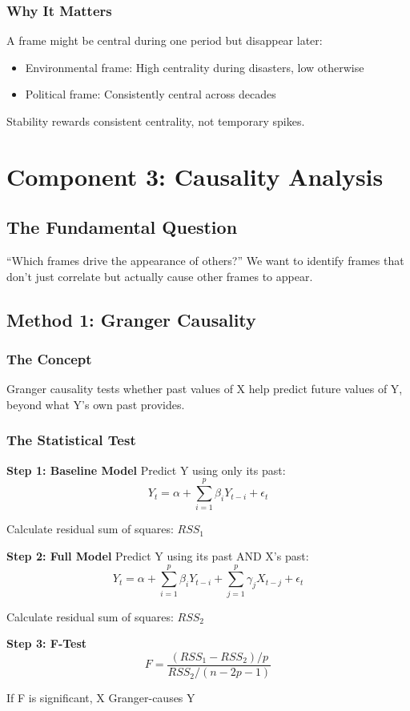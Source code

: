 \documentclass[11pt]{article}
\begin{document}
\subsubsection{Why It Matters}

A frame might be central during one period but disappear later:
\begin{itemize}
    \item Environmental frame: High centrality during disasters, low otherwise
    \item Political frame: Consistently central across decades
\end{itemize}

Stability rewards consistent centrality, not temporary spikes.

\section{Component 3: Causality Analysis}

\subsection{The Fundamental Question}

``Which frames drive the appearance of others?'' We want to identify frames that don't just correlate but actually cause other frames to appear.

\subsection{Method 1: Granger Causality}

\subsubsection{The Concept}

Granger causality tests whether past values of X help predict future values of Y, beyond what Y's own past provides.

\subsubsection{The Statistical Test}

\begin{tcolorbox}[mybox={Granger Causality Procedure}]
\textbf{Step 1: Baseline Model}
Predict Y using only its past:
\[Y_t = \alpha + \sum_{i=1}^{p} \beta_i Y_{t-i} + \epsilon_t\]

Calculate residual sum of squares: $RSS_1$

\textbf{Step 2: Full Model}
Predict Y using its past AND X's past:
\[Y_t = \alpha + \sum_{i=1}^{p} \beta_i Y_{t-i} + \sum_{j=1}^{p} \gamma_j X_{t-j} + \epsilon_t\]

Calculate residual sum of squares: $RSS_2$

\textbf{Step 3: F-Test}
\[F = \frac{(RSS_1 - RSS_2)/p}{RSS_2/(n-2p-1)}\]

If F is significant, X Granger-causes Y
\end{tcolorbox}
\end{document}
